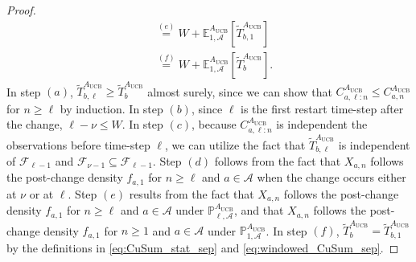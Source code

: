\documentclass[10pt,a4paper]{amsart}
\newcommand{\E}{\mathbb{E}}
\newcommand{\lb}{\left[}
\newcommand{\mbb}{\mathbb}
\newcommand{\mcal}{\mathcal}
\newcommand{\mrm}{\mathrm}
\newcommand{\rb}{\right]}
\begin{document}
\begin{proof}
\begin{align}
    &\overset{(e)}{=} W + \E_{1,\mcal{A}}^{A_{\mrm{UCB}}} \lb \tilde{T}_{b, 1}^{A_{\mrm{UCB}}} \rb \nonumber\\
    &\overset{(f)}{=} W + \E_{1,\mcal{A}}^{A_{\mrm{UCB}}} \lb \tilde{T}_{b}^{A_{\mrm{UCB}}} \rb. \label{eq:CuSum_Lem1_laststep_sep}
\end{align}
%
In step $(a)$, $\tilde{T}_{b, \ell}^{A_{\mrm{UCB}}} \geq \tilde{T}_{b}^{A_{\mrm{UCB}}}$ almost surely, since we can show that $C_{a,\ell:n}^{A_{\mrm{UCB}}} \leq C_{a,n}^{A_{\mrm{UCB}}}$ for $n \geq \ell$ by induction. In step $(b)$, since $\ell$ is the first restart time-step after the change, $\ell - \nu \leq W$. In step $(c)$, because $C_{a,\ell:n}^{A_{\mrm{UCB}}}$ is independent the observations before time-step $\ell$, we can utilize the fact that $\tilde{T}_{b, \ell}^{A_{\mrm{UCB}}}$ is independent of $\mcal{F}_{\ell - 1}$ and $\mcal{F}_{\nu - 1} \subseteq \mcal{F}_{\ell - 1}$. Step $(d)$ follows from the fact that $X_{a,n}$ follows the post-change density $f_{a,1}$ for $n \geq \ell$ and $a \in \mcal{A}$ when the change occurs either at $\nu$ or at $\ell$. Step $(e)$ results from the fact that $X_{a,n}$ follows the post-change density $f_{a,1}$ for $n \geq \ell$ and $a \in \mcal{A}$ under $\mbb{P}_{\ell, \mcal{A}}^{A_{\mrm{UCB}}}$, and that $X_{a,n}$ follows the post-change density $f_{a,1}$ for $n \geq 1$ and $a \in \mcal{A}$ under $\mbb{P}_{1, \mcal{A}}^{A_{\mrm{UCB}}}$. In step $(f)$, $\tilde{T}_{b}^{A_{\mrm{UCB}}}=\tilde{T}_{b, 1}^{A_{\mrm{UCB}}}$  by the definitions in \eqref{eq:CuSum_stat_sep} and \eqref{eq:windowed_CuSum_sep}.
\end{proof}
\end{document}
